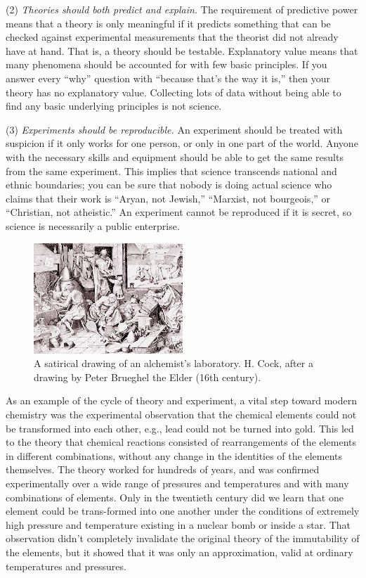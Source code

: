 (2) \emph{Theories should both predict and explain.} The
requirement of predictive power means that a theory is only
meaningful if it predicts something that can be checked
against experimental measurements that the theorist did not
already have at hand. That is, a theory should be testable.
Explanatory value means that many phenomena should be
accounted for with few basic principles. If you answer every
``why'' question with ``because that's the way it is,'' then
your theory has no explanatory value. Collecting lots of
data without being able to find any basic underlying
principles is not science.

(3) \emph{Experiments should be reproducible.} An experiment
should be treated with suspicion if it only works for one
person, or only in one part of the world. Anyone with the
necessary skills and equipment should be able to get the
same results from the same experiment. This implies that
science transcends national and ethnic boundaries; you can
be sure that nobody is doing actual science who claims that
their work is ``Aryan, not Jewish,'' ``Marxist, not
bourgeois,'' or ``Christian, not atheistic.'' An experiment
cannot be reproduced if it is secret, so science is
necessarily a public enterprise.


\begin{figure}[ht]
\begin{center}
  \includegraphics[width=0.5\textwidth]{./introduction/figs/alchemy}
  \caption{A satirical drawing of an alchemist's
      laboratory. H. Cock, after a drawing
      by Peter Brueghel the Elder (16th
      century).}
	  \end{center}
\end{figure}


As an example of the cycle of theory and experiment, a vital
step toward modern chemistry was the experimental observation
that the chemical elements could not be transformed into
each other, e.g., lead could not be turned into gold. This
led to the theory that chemical reactions consisted of
rearrangements of the elements in different combinations,
without any change in the identities of the elements
themselves. The theory worked for hundreds of years, and was
confirmed experimentally over a wide range of pressures and
temperatures and with many combinations of elements. Only in
the twentieth century did we learn that one element could be
trans-formed into one another under the conditions of
extremely high pressure and temperature existing in a
nuclear bomb or inside a star. That observation didn't
completely invalidate the original theory of the immutability
of the elements, but it showed that it was only an
approximation, valid at ordinary temperatures and pressures.


